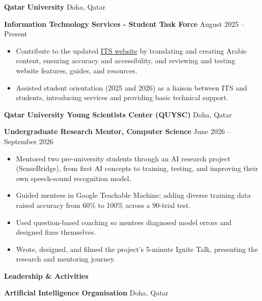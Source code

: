 \documentclass[10pt]{article}
\begin{document}
\vspace{8pt}

\textbf{Qatar University} \hfill Doha, Qatar

\textbf{Information Technology Services - Student Task Force} \hfill August 2025 – Present
\begin{itemize}[noitemsep, topsep=0pt, partopsep=0pt, parsep=0pt]
    \item Contribute to the updated \href{https://www.qu.edu.qa/en-us/offices/its/}{ITS website} by translating and creating Arabic content, ensuring accuracy and accessibility,
and reviewing and testing website features, guides, and resources.
    \item Assisted student orientation (2025 and 2026) as a liaison between ITS and students, introducing services and providing basic technical support.
\end{itemize}

\vspace{8pt}

\textbf{Qatar University Young Scientists Center (QUYSC)} \hfill Doha, Qatar

\textbf{Undergraduate Research Mentor, Computer Science} \hfill June 2026 – September 2026
\begin{itemize}[noitemsep, topsep=0pt, partopsep=0pt, parsep=0pt]
    \item Mentored two pre-university students through an AI research project (SenseBridge), from first AI concepts to training, testing, and improving their own speech-sound recognition model.
    \item Guided mentees in Google Teachable Machine; adding diverse training data raised accuracy from 60\% to 100\% across a 90-trial test.
    \item Used question-based coaching so mentees diagnosed model errors and designed fixes themselves.
    \item Wrote, designed, and filmed the project's 5-minute Ignite Talk, presenting the research and mentoring journey.
\end{itemize}

\begin{center}
    \fontsize{11}{13}\textbf{Leadership \& Activities}
\end{center}

\textbf{Artificial Intelligence Organisation} \hfill Doha, Qatar
\end{document}
